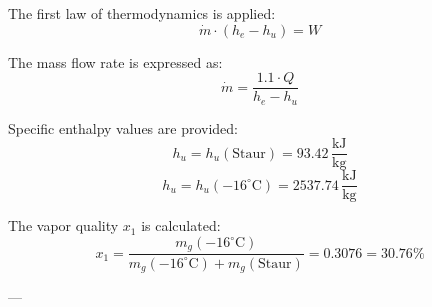 The first law of thermodynamics is applied:  
\[
\dot{m} \cdot (h_e - h_u) = W
\]  

The mass flow rate is expressed as:  
\[
\dot{m} = \frac{1.1 \cdot Q}{h_e - h_u}
\]  

Specific enthalpy values are provided:  
\[
h_u = h_u(\text{Staur}) = 93.42 \, \frac{\text{kJ}}{\text{kg}}
\]  
\[
h_u = h_u(-16^\circ\text{C}) = 2537.74 \, \frac{\text{kJ}}{\text{kg}}
\]  

The vapor quality \( x_1 \) is calculated:  
\[
x_1 = \frac{m_g(-16^\circ\text{C})}{m_g(-16^\circ\text{C}) + m_g(\text{Staur})} = 0.3076 = 30.76\%
\]  

---